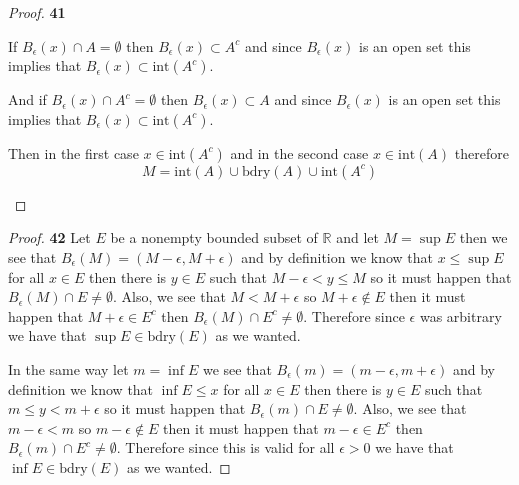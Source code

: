 \documentclass[11pt]{article}
\newcommand{\R}{\mathbb{R}}
\newcommand{\bdry}{\text{bdry}}
\newcommand{\inter}{\text{int}}
\theoremstyle{definition}
\begin{document}
\begin{proof}{\textbf{41}}
\begin{itemize}
        If $B_{\epsilon}(x) \cap A = \emptyset$ then $B_{\epsilon}(x) \subset A^c$
        and since $B_{\epsilon}(x)$ is an open set this implies that
        $B_{\epsilon}(x) \subset \inter(A^c)$.
        
        And if $B_{\epsilon}(x) \cap A^c = \emptyset$ then
        $B_{\epsilon}(x) \subset A$ and since $B_{\epsilon}(x)$ is an open set
        this implies that $B_{\epsilon}(x) \subset \inter(A^c)$.
        
        Then in the first case $x \in \inter(A^c)$ and in the second case
        $x \in \inter(A)$ therefore
        $$M = \inter(A) \cup \bdry(A) \cup \inter(A^c)$$
    \end{itemize}
    \end{proof}
    \begin{proof}{\textbf{42}}
        Let $E$ be a nonempty bounded subset of $\R$ and let $M = \sup E$ then
        we see that $B_{\epsilon}(M) = (M - \epsilon, M + \epsilon)$ and
        by definition we know that $x \leq \sup E$ for all $x \in E$ then
        there is $y \in E$ such that $M - \epsilon < y \leq M$
        so it must happen that $B_{\epsilon}(M) \cap E \neq \emptyset$. Also, we
        see that $M < M+\epsilon$ so $M+\epsilon \not\in E$ then it must happen that
        $M+\epsilon \in E^c$ then $B_{\epsilon}(M) \cap E^c \neq \emptyset$.
        Therefore since $\epsilon$ was arbitrary we have that
        $\sup E \in \bdry(E)$ as we wanted.

        In the same way let $m = \inf E$
        we see that $B_{\epsilon}(m) = (m - \epsilon, m + \epsilon)$ and
        by definition we know that $\inf E \leq x$ for all $x \in E$ then
        there is $y \in E$ such that $m \leq y < m + \epsilon$ so it must happen
        that $B_{\epsilon}(m) \cap E \neq \emptyset$. Also, we see that
        $m - \epsilon < m$ so $m - \epsilon \not\in E$ then it must happen that
        $m - \epsilon \in E^c$ then $B_{\epsilon}(m) \cap E^c \neq \emptyset$.
        Therefore since this is valid for all $\epsilon > 0$ we have that
        $\inf E \in \bdry(E)$ as we wanted.
    \end{proof}
\cleardoublepage
\end{document}

